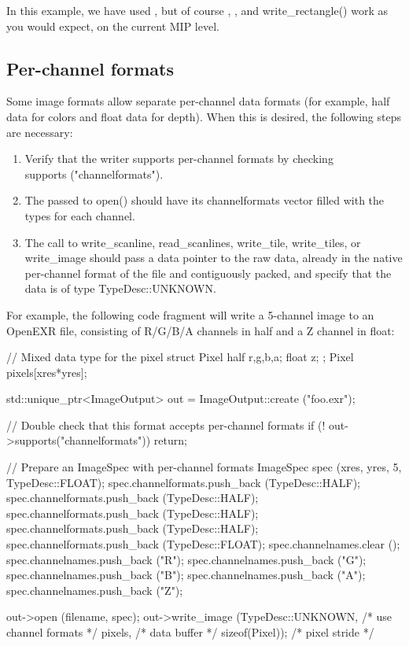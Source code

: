 In this example, we have used \writeimage, but of course \writescanline,
\writetile, and {\cf write_rectangle()} work as you would expect, on the
current MIP level.


\subsection{Per-channel formats}
\label{sec:imageoutput:channelformats}

Some image formats allow separate per-channel data formats (for example,
{\cf half} data for colors and {\cf float} data for depth).  When this
is desired, the following steps are necessary:

\begin{enumerate}
\item Verify that the writer supports per-channel formats by checking \\
  {\cf supports ("channelformats")}.
\item The \ImageSpec passed to {\cf open()} should have its {\cf
  channelformats} vector filled with the types for each channel.
\item The call to {\cf write_scanline}, {\cf read_scanlines},
  {\cf write_tile}, {\cf write_tiles}, or {\cf
  write_image} should pass a {\cf data} pointer to the raw data, already
  in the native per-channel format of the file and contiguously packed,
  and specify that the data is of type {\cf TypeDesc::UNKNOWN}.
\end{enumerate}

For example, the following code fragment will write a 5-channel image
to an OpenEXR file, consisting of R/G/B/A channels in {\cf half} and
a Z channel in {\cf float}:

\begin{code}
        // Mixed data type for the pixel
        struct Pixel { half r,g,b,a; float z; };
        Pixel pixels[xres*yres];

        std::unique_ptr<ImageOutput> out = ImageOutput::create ("foo.exr");

        // Double check that this format accepts per-channel formats
        if (! out->supports("channelformats")) {
            return;
        }

        // Prepare an ImageSpec with per-channel formats
        ImageSpec spec (xres, yres, 5, TypeDesc::FLOAT);
        spec.channelformats.push_back (TypeDesc::HALF);
        spec.channelformats.push_back (TypeDesc::HALF);
        spec.channelformats.push_back (TypeDesc::HALF);
        spec.channelformats.push_back (TypeDesc::HALF);
        spec.channelformats.push_back (TypeDesc::FLOAT);
        spec.channelnames.clear ();
        spec.channelnames.push_back ("R");
        spec.channelnames.push_back ("G");
        spec.channelnames.push_back ("B");
        spec.channelnames.push_back ("A");
        spec.channelnames.push_back ("Z");

        out->open (filename, spec);
        out->write_image (TypeDesc::UNKNOWN, /* use channel formats */
                          pixels,            /* data buffer */
                          sizeof(Pixel));    /* pixel stride */
\end{code}


